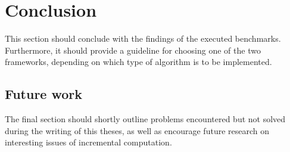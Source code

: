 \section{Conclusion}
This section should conclude with the findings of the executed benchmarks. Furthermore, it should provide a guideline for choosing one of the two frameworks, depending on which type of algorithm is to be implemented. 

\subsection{Future work}
The final section should shortly outline problems encountered but not solved during the writing of this theses, as well as encourage future research on interesting issues of incremental computation.

 